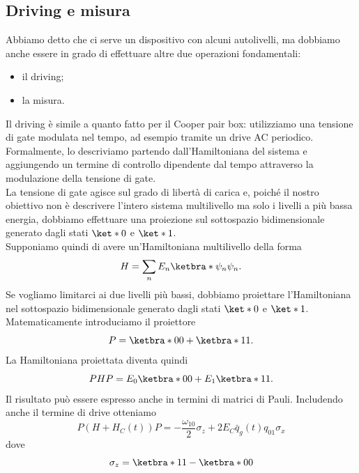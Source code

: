 \subsection{Driving e misura}
Abbiamo detto che ci serve un dispositivo con alcuni autolivelli, ma dobbiamo anche essere in grado di effettuare altre due operazioni fondamentali:
\begin{itemize}[leftmargin=0.5cm]
    \item il driving;
    \item la misura.
\end{itemize}
Il driving è simile a quanto fatto per il Cooper pair box: utilizziamo una tensione di gate modulata nel tempo, ad esempio tramite un drive AC periodico. Formalmente, lo descriviamo partendo dall'Hamiltoniana del sistema e aggiungendo un termine di controllo dipendente dal tempo attraverso la modulazione della tensione di gate.\\
La tensione di gate agisce sul grado di libertà di carica e, poiché il nostro obiettivo non è descrivere l'intero sistema multilivello ma solo i livelli a più bassa energia, dobbiamo effettuare una proiezione sul sottospazio bidimensionale generato dagli stati $\ket*{0}$ e $\ket*{1}$.\\
Supponiamo quindi di avere un'Hamiltoniana multilivello della forma
\begin{equation*}
    H
    =
    \sum_n E_n \ketbra*{\psi_n}{\psi_n}.
\end{equation*}
Se vogliamo limitarci ai due livelli più bassi, dobbiamo proiettare l'Hamiltoniana nel sottospazio bidimensionale generato dagli stati $\ket*{0}$ e $\ket*{1}$. Matematicamente introduciamo il proiettore
\begin{equation*}
    P
    =
    \ketbra*{0}{0}
    +
    \ketbra*{1}{1}.
\end{equation*}
La Hamiltoniana proiettata diventa quindi
\begin{equation*}
    PHP
    =
    E_0 \ketbra*{0}{0}
    +
    E_1 \ketbra*{1}{1}.
\end{equation*}
Il risultato può essere espresso anche in termini di matrici di Pauli. Includendo anche il termine di drive otteniamo
\begin{equation*}
    P(H+H_C(t))P
    =
    -\frac{\omega_{10}}{2}\sigma_z
    +
    2E_C \bar{q}_g(t) q_{01}\sigma_x
\end{equation*}
dove
\begin{equation*}
    \sigma_z
    =
    \ketbra*{1}{1}
    -
    \ketbra*{0}{0}
\end{equation*}
